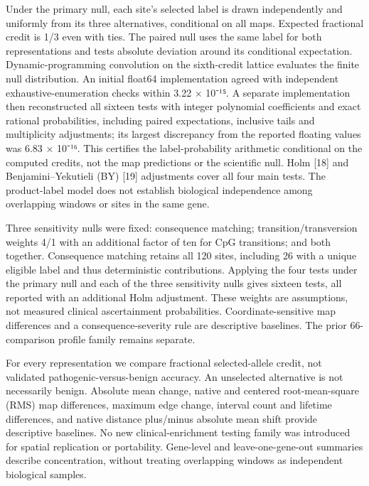 \documentclass[
  11pt,
]{article}
\begin{document}
Under the primary null, each site's selected label is drawn
independently and uniformly from its three alternatives, conditional on
all maps. Expected fractional credit is 1/3 even with ties. The paired
null uses the same label for both representations and tests absolute
deviation around its conditional expectation. Dynamic-programming
convolution on the sixth-credit lattice evaluates the finite null
distribution. An initial float64 implementation agreed with independent
exhaustive-enumeration checks within 3.22 × 10⁻¹⁵. A separate
implementation then reconstructed all sixteen tests with integer
polynomial coefficients and exact rational probabilities, including
paired expectations, inclusive tails and multiplicity adjustments; its
largest discrepancy from the reported floating values was 6.83 × 10⁻¹⁶.
This certifies the label-probability arithmetic conditional on the
computed credits, not the map predictions or the scientific null. Holm
{[}18{]} and Benjamini--Yekutieli (BY) {[}19{]} adjustments cover all
four main tests. The product-label model does not establish biological
independence among overlapping windows or sites in the same gene.

Three sensitivity nulls were fixed: consequence matching;
transition/transversion weights 4/1 with an additional factor of ten for
CpG transitions; and both together. Consequence matching retains all 120
sites, including 26 with a unique eligible label and thus deterministic
contributions. Applying the four tests under the primary null and each
of the three sensitivity nulls gives sixteen tests, all reported with an
additional Holm adjustment. These weights are assumptions, not measured
clinical ascertainment probabilities. Coordinate-sensitive map
differences and a consequence-severity rule are descriptive baselines.
The prior 66-comparison profile family remains separate.

For every representation we compare fractional selected-allele credit,
not validated pathogenic-versus-benign accuracy. An unselected
alternative is not necessarily benign. Absolute mean change, native and
centered root-mean-square (RMS) map differences, maximum edge change,
interval count and lifetime differences, and native distance plus/minus
absolute mean shift provide descriptive baselines. No new
clinical-enrichment testing family was introduced for spatial
replication or portability. Gene-level and leave-one-gene-out summaries
describe concentration, without treating overlapping windows as
independent biological samples.
\end{document}
